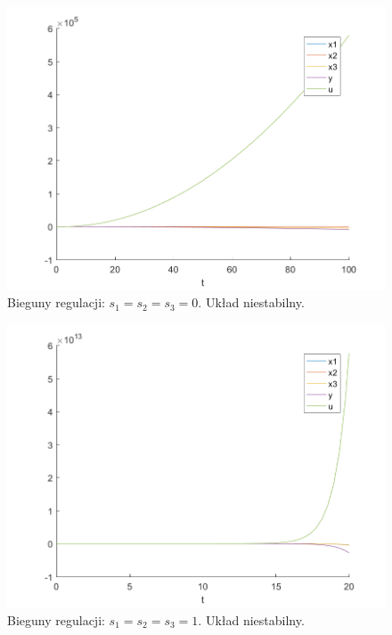 \documentclass{article}
\begin{document}
\begin{figure}[H]
\centering
\includegraphics[width=0.9\linewidth]{z6_0}
\caption{Bieguny regulacji: $s_1 = s_2 = s_3 = 0$. Układ niestabilny.}
\label{fig:z60}
\end{figure}

\begin{figure}[H]
\centering
\includegraphics[width=0.9\linewidth]{z6_1}
\caption{Bieguny regulacji: $s_1 = s_2 = s_3 = 1$. Układ niestabilny.}
\label{fig:z61}
\end{figure}
\end{document}
